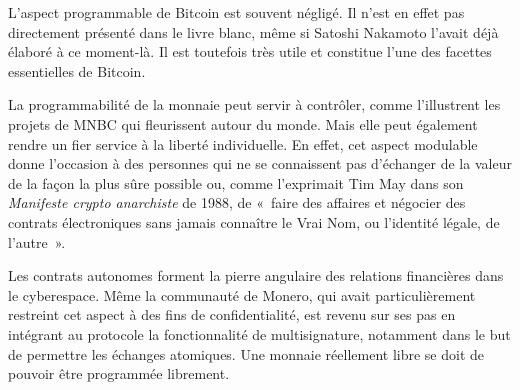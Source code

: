 L'aspect programmable de Bitcoin est souvent négligé. Il n'est en effet pas directement présenté dans le livre blanc, même si Satoshi Nakamoto l'avait déjà élaboré à ce moment-là. Il est toutefois très utile et constitue l'une des facettes essentielles de Bitcoin.

La programmabilité de la monnaie peut servir à contrôler, comme l'illustrent les projets de MNBC qui fleurissent autour du monde. Mais elle peut également rendre un fier service à la liberté individuelle. En effet, cet aspect modulable donne l'occasion à des personnes qui ne se connaissent pas d'échanger de la valeur de la façon la plus sûre possible ou, comme l'exprimait Tim May dans son \emph{Manifeste crypto anarchiste} de 1988, de «~faire des affaires et négocier des contrats électroniques sans jamais connaître le Vrai Nom, ou l'identité légale, de l'autre~».

Les contrats autonomes forment la pierre angulaire des relations financières dans le cyberespace. Même la communauté de Monero, qui avait particulièrement restreint cet aspect à des fins de confidentialité, est revenu sur ses pas en intégrant au protocole la fonctionnalité de multisignature, notamment dans le but de permettre les échanges atomiques. Une monnaie réellement libre se doit de pouvoir être programmée librement.